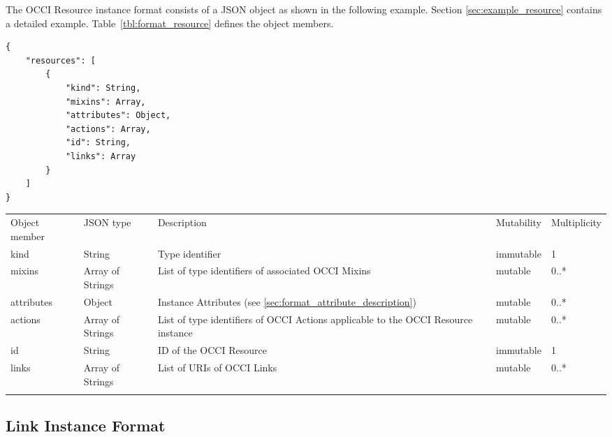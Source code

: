 \documentclass[10pt,a4paper]{article}
\begin{document}
The OCCI Resource instance format consists of a JSON object as shown in the
following example. Section \ref{sec:example_resource} contains a detailed
example.
Table~\ref{tbl:format_resource} defines the object members.
\begin{lstlisting}
{
    "resources": [
        {
            "kind": String,
            "mixins": Array,
            "attributes": Object,
            "actions": Array,
            "id": String,
            "links": Array
        }
    ]
}
\end{lstlisting}
 {
    \begin{tabularx}{\textwidth}{llXll}
    \toprule
    Object member & JSON type & Description & Mutability & Multiplicity \\
    \colrule
    kind & String & Type identifier & immutable & 1 \\

    mixins & Array of Strings & List of type identifiers of associated OCCI
Mixins  &
mutable & 0..* \\

    attributes & Object & Instance Attributes (see
\ref{sec:format_attribute_description}) & mutable & 0..* \\
    
    actions & Array of Strings & List of type identifiers of OCCI
Actions applicable to the OCCI Resource instance & mutable & 0..* \\
    
    id & String & ID of the OCCI Resource & immutable & 1\\
            
    links & Array of Strings & List of URIs of OCCI Links & mutable & 0..*\\
    \botrule
    \end{tabularx}
}

\subsection{Link Instance Format}
\label{sec:format_link}
\end{document}

